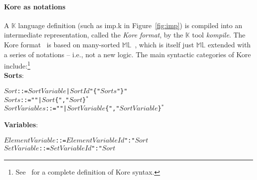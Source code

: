 \documentclass{article}
\theoremstyle{plain}
\theoremstyle{definition}
\newcommand{\K}{$\mathbb{K}$\xspace}
\newcommand{\ML}{$\mathbb{ML}$\xspace}
\newcommand{\SortIt}{\ensuremath{\mathit{Sort}}}
\newcommand{\Sorts}{\ensuremath{\mathit{Sorts}}}
\newcommand{\SortVariable}{\ensuremath{\mathit{SortVariable}}}
\newcommand{\SortVariables}{\ensuremath{\mathit{SortVariables}}}
\newcommand{\SortId}{\ensuremath{\mathit{SortId}}}
\newcommand{\ElementVariable}{\ensuremath{\mathit{ElementVariable}}}
\newcommand{\SetVariable}{\ensuremath{\mathit{SetVariable}}}
\newcommand{\ElementVariableId}{\ensuremath{\mathit{ElementVariableId}}}
\newcommand{\SetVariableId}{\ensuremath{\mathit{SetVariableId}}}
\begin{document}
\paragraph{Kore as notations\\}
\label{sec:kore}

A \K language definition (such as imp.k in
Figure~\ref{fig:imp}) is compiled into an intermediate representation, called the \emph{Kore format}, by the \K tool \emph{kompile}.
The Kore format~\cite{kore-github} is based on many-sorted \ML~\cite{CR19}, which is itself just \ML extended with a series of notations -- i.e., not a new logic.
The main syntactic categories of Kore include:\footnote{See~\cite{kore-github} for a complete definition of Kore syntax.}\\

\noindent
\textbf{Sorts}:
\begin{alltt}
  \(\SortIt\)  ::= \(\SortVariable\) | \(\SortId\) "\{" \(\Sorts\) "\}"
  \(\Sorts\) ::= "" | \(\SortIt\) \{"," \(\SortIt\)\}\(^*\)
  \(\SortVariables\) ::= "" | \(\SortVariable\) \{"," \(\SortVariable\)\}\(^*\)
\end{alltt}

\noindent
\textbf{Variables}:
\begin{alltt}
  \(\ElementVariable\) ::= \(\ElementVariableId\) ":" \(\SortIt\)
  \(\SetVariable\) ::= \(\SetVariableId\) ":" \(\SortIt\)
\end{alltt}
\end{document}
